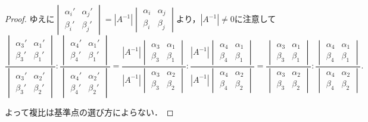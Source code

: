 \documentclass{jsarticle}
\theoremstyle{definition}
\numberwithin{theorem}{section}
\numberwithin{equation}{section}
\begin{document}
\begin{proof}
ゆえに$\begin{vmatrix}
    \alpha_i' & \alpha_j'
    \\ \beta_i' & \beta_j'
\end{vmatrix}=|A^{-1}|\begin{vmatrix}
   \alpha_i & \alpha_j
\\ \beta_i & \beta_j
\end{vmatrix}$より，$|A^{-1}|\neq 0$に注意して
$$\frac{\begin{vmatrix}
\alpha_3' & \alpha_1'
\\ \beta_3' & \beta_1'
\end{vmatrix}}{\begin{vmatrix}
    \alpha_3' & \alpha_2'
\\ \beta_3' & \beta_2'
\end{vmatrix}}:\frac{\begin{vmatrix}
    \alpha_4' & \alpha_1'
\\ \beta_4' & \beta_1'
\end{vmatrix}}{\begin{vmatrix}
   \alpha_4' & \alpha_2'
\\ \beta_4' & \beta_2'
\end{vmatrix}}=\frac{|A^{-1}|\begin{vmatrix}
\alpha_3 & \alpha_1
\\ \beta_3 & \beta_1
\end{vmatrix}}{|A^{-1}|\begin{vmatrix}
    \alpha_3 & \alpha_2
\\ \beta_3 & \beta_2
\end{vmatrix}}:\frac{|A^{-1}|\begin{vmatrix}
    \alpha_4 & \alpha_1
\\ \beta_4 & \beta_1
\end{vmatrix}}{|A^{-1}|\begin{vmatrix}
   \alpha_4 & \alpha_2
\\ \beta_4 & \beta_2
\end{vmatrix}}=\frac{\begin{vmatrix}
\alpha_3 & \alpha_1
\\ \beta_3 & \beta_1
\end{vmatrix}}{\begin{vmatrix}
    \alpha_3 & \alpha_2
\\ \beta_3 & \beta_2
\end{vmatrix}}:\frac{\begin{vmatrix}
    \alpha_4 & \alpha_1
\\ \beta_4 & \beta_1
\end{vmatrix}}{\begin{vmatrix}
   \alpha_4 & \alpha_2
\\ \beta_4 & \beta_2
\end{vmatrix}}.$$
\par よって複比は基準点の選び方によらない．
\end{proof}
\end{document}
